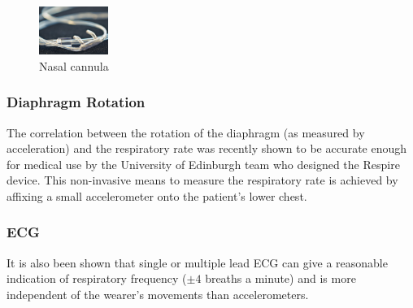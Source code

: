 \begin{figure}
  \vspace{-10pt}
  \begin{center}
    \includegraphics[width=0.2\textwidth, keepaspectratio=true]{images/nasal_canula.png}
  \end{center}
  \caption[Nasal Cannula]{Nasal cannula}
  \vspace{-10pt}
\end{figure}

\subsubsection{Diaphragm Rotation}
The correlation between the rotation of the diaphragm (as measured by acceleration) and the
respiratory rate was recently shown to be accurate enough for medical use by the University of
Edinburgh team who designed the Respire device. This non-invasive
means to measure the respiratory rate is achieved by affixing a small accelerometer onto
the patient's lower chest.


\subsubsection{\acf{ECG}}
It is also been shown that single or multiple lead \ac{ECG} can give a reasonable indication of respiratory
frequency ($\pm4$ breaths a minute) and is more independent of the wearer's movements than
accelerometers.

